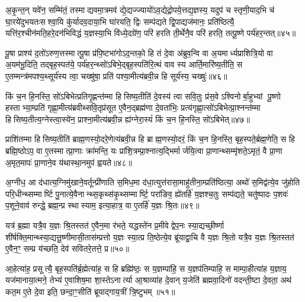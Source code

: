 अ॒कृ॒न्त॒न् यवे॑न॒ सम्मि॑तं॒ तस्माद्यवमा॒त्रमव॑ द्ये॒द्यज्ज्यायो॑ऽव॒द्येद्रो॒पये॒त्तद्य॒ज्ञस्य॒ यदुप॑ च स्तृणी॒याद॒भि च॑ घा॒रये॑दुभयतःसश्वा॒यि कु॑र्यादव॒दाया॒भि घा॑रयति॒ द्विः सम्प॑द्यते द्वि॒पाद्यज॑मानः॒ प्रति॑ष्ठित्यै॒ यत्ति॑र॒श्चीन॑मति॒हरे॒दन॑भिविद्धं य॒ज्ञस्या॒भि वि॑ध्ये॒दग्रे॑ण॒ परि॑ हरति ती॒र्थेनै॒व परि॑ हरति॒ तत्पू॒ष्णे पर्य॑हर॒न्तत्॥४५॥

पू॒षा प्राश्य॑ द॒तो॑ऽरुण॒त्तस्मात्पू॒षा प्र॑पि॒ष्टभा॑गोऽद॒न्तको॒ हि तं दे॒वा अ॑ब्रुव॒न्वि वा अ॒यमार्ध्यप्राशित्रि॒यो वा अ॒यम॑भू॒दिति॒ तद्बृह॒स्पत॑ये॒ पर्य॑हर॒न्थ्सो॑ऽबिभे॒द्बृह॒स्पति॑रि॒त्थं वाव स्य आर्ति॒मारि॑ष्य॒तीति॒ स ए॒तम्मन्त्र॑मपश्य॒थ्सूर्य॑स्य त्वा॒ चख्षु॑षा॒ प्रति॑ पश्या॒मीत्य॑ब्रवी॒न्न हि सूर्य॑स्य॒ चख्षुः॑॥४६॥

किं च॒न हि॒नस्ति॒ सो॑ऽबिभेत्प्रतिगृ॒ह्णन्त॑म्मा हिसिष्य॒तीति॑ दे॒वस्य॑ त्वा सवि॒तुः प्र॑स॒वेऽश्विनोर्बा॒हुभ्यां पू॒ष्णो हस्ताभ्या॒म्प्रति॑ गृह्णा॒मीत्य॑ब्रवीथ्सवि॒तृप्र॑सूत ए॒वैन॒द्ब्रह्म॑णा दे॒वता॑भिः॒ प्रत्य॑गृह्णा॒त्सो॑ऽबिभेत्प्रा॒श्नन्त॑म्मा हिसिष्य॒तीत्य॒ग्नेस्त्वा॒स्ये॑न॒ प्राश्ना॒मीत्य॑ब्रवी॒न्न ह्य॑ग्नेरा॒स्यं॑ किं च॒न हि॒नस्ति॒ सो॑ऽबिभेत्॥४७॥

प्राशि॑तम्मा हिसिष्य॒तीति॑ ब्राह्म॒णस्यो॒दरे॒णेत्य॑ब्रवी॒न्न हि ब्राह्म॒णस्यो॒दरं॒ किं च॒न हि॒नस्ति॒ बृह॒स्पते॒र्ब्रह्म॒णेति॒ स हि ब्रह्मि॒ष्ठोऽप॒ वा ए॒तस्मात्प्रा॒णाः क्रा॑मन्ति॒ यः प्रा॑शि॒त्रम्प्रा॒श्नात्य॒द्भिर्मार्जयि॒त्वा प्रा॒णान्थ्सम्मृ॑शते॒ऽमृतं॒ वै प्रा॒णा अ॒मृत॒मापः॑ प्रा॒णाने॒व य॑थास्था॒नमुप॑ ह्वयते॥४८॥

{\anuvakamend[{प्रा॒श्ञी॒याद्धोता॑ य॒ज्ञन्निर॑हर॒न्तच्चख्षु॑रा॒स्य॑ङ्किञ्च॒न हि॒नस्ति॒ सो॑ऽबिभे॒च्चतु॑श्चत्वारिशच्च॥८॥}]}

अ॒ग्नीध॒ आ द॑धात्य॒ग्निमु॑खाने॒वर्तून्प्री॑णाति स॒मिध॒मा द॑धा॒त्युत्त॑रासा॒माहु॑तीना॒म्प्रति॑ष्ठित्या॒ अथो॑ स॒मिद्व॑त्ये॒व जु॑होति परि॒धीन्थ्सम्मार्ष्टि पु॒नात्ये॒वैनान्थ्स॒कृथ्स॑कृ॒थ्सम्मार्ष्टि॒ परा॑ङिव॒ ह्ये॑तर्\mbox{}हि॑ य॒ज्ञश्च॒तुः सम्प॑द्यते॒ चतु॑ष्पादः प॒शवः॑ प॒शूने॒वाव॑ रुन्द्धे॒ ब्रह्म॒न्प्र स्थास्याम॒ इत्या॒हात्र॒ वा ए॒तर्\mbox{}हि॑ य॒ज्ञः श्रि॒तः॥४९॥

यत्र॑ ब्र॒ह्मा यत्रै॒व य॒ज्ञः श्रि॒तस्तत॑ ए॒वैन॒मा र॑भते॒ यद्धस्ते॑न प्र॒मीवेद्वेप॒नः स्या॒द्यच्छी॒र्ष्णा शी॑र्\mbox{}षक्ति॒मान्थ्स्या॒द्यत्तू॒ष्णीमासी॒तास॑म्प्रत्तो य॒ज्ञः स्या॒त्प्र ति॒ष्ठेत्ये॒व ब्रू॑याद्वा॒चि वै य॒ज्ञः श्रि॒तो यत्रै॒व य॒ज्ञः श्रि॒तस्तत॑ ए॒वैन॒ꣳ॒ सम्प्र य॑च्छति॒ देव॑ सवितरे॒तत्ते॒ प्र॥५०॥

आ॒हेत्या॑ह॒ प्रसूत्यै॒ बृह॒स्पति॑र्ब्र॒ह्मेत्या॑ह॒ स हि ब्रह्मि॑ष्ठः॒ स य॒ज्ञम्पा॑हि॒ स य॒ज्ञप॑तिम्पाहि॒ स माम्पा॒हीत्या॑ह य॒ज्ञाय॒ यज॑मानाया॒त्मने॒ तेभ्य॑ ए॒वाशिष॒मा शा॒स्तेऽनार्त्या आ॒श्राव्या॑ह दे॒वान् य॒जेति॑ ब्रह्मवा॒दिनो॑ वदन्ती॒ष्टा दे॒वता॒ अथ॑ कत॒म ए॒ते दे॒वा इति॒ छन्दा॒ꣳ॒सीति॑ ब्रूयाद्गाय॒त्रीं त्रि॒ष्टुभम्॥५१॥

